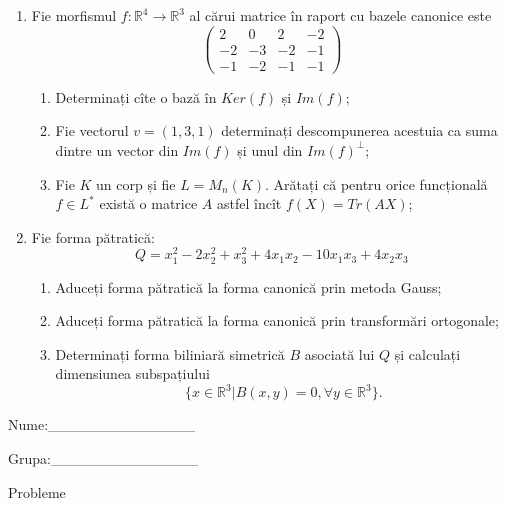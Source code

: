 \documentclass{article}
\begin{document}
\begin{enumerate}
 \item Fie morfismul $f:\mathbb{R}^4 \to \mathbb{R}^3$ al cărui matrice în raport cu bazele canonice este
$$\begin{pmatrix}
2&0&2&-2\\
-2&-3&-2&-1\\
-1&-2&-1&-1
\end{pmatrix}$$

\begin{enumerate}
\item Determinați cîte o bază în $Ker(f)$ și $Im(f)$;
\item Fie vectorul $v=(1,3,1)$ determinați descompunerea acestuia ca suma dintre un vector din $Im(f)$ și unul din $Im(f)^\perp$;
\item Fie $K$ un corp și fie $L=M_n(K)$. Arătați că pentru orice funcțională $f \in L^*$ există o matrice $A$ astfel încît $f(X)=Tr(AX)$;
\end{enumerate}
\item Fie forma pătratică:
$$Q= x_1^2-2x_2^2+x_3^2+4x_1x_2-10x_1x_3+4x_2x_3$$

\begin{enumerate}
\item Aduceți forma pătratică la forma canonică prin metoda Gauss;
\item Aduceți forma pătratică la forma canonică prin transformări ortogonale;
\item Determinați forma biliniară simetrică $B$ asociată lui $Q$ și calculați dimensiunea subspațiului
$$\{x \in \mathbb{R}^3 | B(x,y)=0,\forall y \in \mathbb{R}^3\}.$$

\end{enumerate}
\end{enumerate}
\newpage
\begin{flushright}
Nume:\_\_\_\_\_\_\_\_\_\_\_\_\_\_
 
 
Grupa:\_\_\_\_\_\_\_\_\_\_\_\_\_\_
\end{flushright}
\begin{center}
\vspace{2cm}
{\Large Probleme}
\vspace{2cm}
\end{center}
\end{document}
